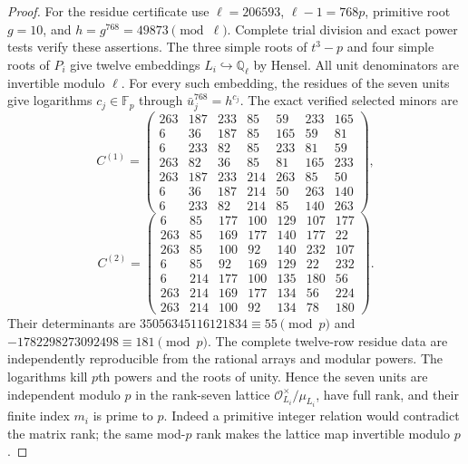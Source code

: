 \begin{proof}
For the residue certificate use $\ell=206593$, $\ell-1=768p$,
primitive root $g=10$, and $h=g^{768}=49873\pmod\ell$.
Complete trial division and exact power tests verify these assertions.
The three simple roots of $t^3-p$ and four simple roots of $P_i$
give twelve embeddings $L_i\hookrightarrow\mathbb Q_\ell$ by Hensel.
All unit denominators are invertible modulo $\ell$.
For every such embedding, the residues of the seven units give
logarithms $c_j\in\mathbb F_p$ through $\bar u_j^{768}=h^{c_j}$.
The exact verified selected minors are
\[
 C^{(1)}=\begin{pmatrix}
263&187&233&85&59&233&165\\
6&36&187&85&165&59&81\\
6&233&82&85&233&81&59\\
263&82&36&85&81&165&233\\
263&187&233&214&263&85&50\\
6&36&187&214&50&263&140\\
6&233&82&214&85&140&263
\end{pmatrix},
 \tag{G147C.11}
\]
\[
 C^{(2)}=\begin{pmatrix}
6&85&177&100&129&107&177\\
263&85&169&177&140&177&22\\
263&85&100&92&140&232&107\\
6&85&92&169&129&22&232\\
6&214&177&100&135&180&56\\
263&214&169&177&134&56&224\\
263&214&100&92&134&78&180
\end{pmatrix}.
 \tag{G147C.12}
\]
Their determinants are $35056345116121834\equiv55\pmod p$
and $-1782298273092498\equiv181\pmod p$.
The complete twelve-row residue data are independently reproducible
from the rational arrays and modular powers.
The logarithms kill $p$th powers and the roots of unity.
Hence the seven units are independent modulo $p$ in the rank-seven
lattice $\mathcal O_{L_i}^\times/\mu_{L_i}$, have full rank, and their
finite index $m_i$ is prime to $p$.
Indeed a primitive integer relation would contradict the matrix
rank; the same mod-$p$ rank makes the lattice map invertible modulo $p$.


\end{proof}
